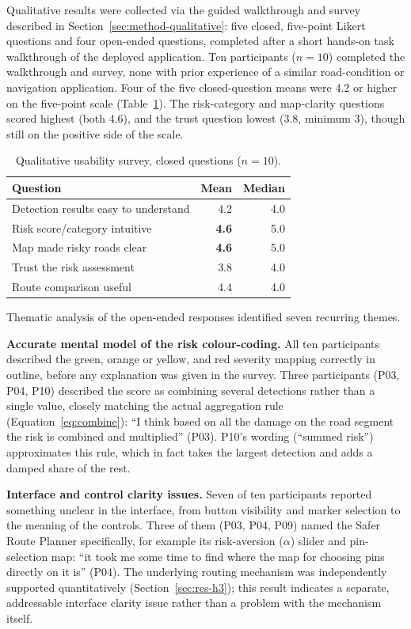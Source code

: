 \documentclass[10pt,a4paper,twocolumn]{article}
\begin{document}
Qualitative results were collected via the guided walkthrough and survey
described in Section~\ref{sec:method-qualitative}: five closed,
five-point Likert questions and four open-ended questions, completed
after a short hands-on task walkthrough of the deployed application.
Ten participants ($n=10$) completed the walkthrough and survey, none with
prior experience of a similar road-condition or navigation application.
Four of the five closed-question means were 4.2 or higher on the five-point
scale (Table~\ref{tab:qual-results}). The risk-category and map-clarity
questions scored highest (both 4.6), and the trust question lowest (3.8,
minimum 3), though still on the positive side of the scale.

\begin{table}[h]
  \centering
  \small
  \caption{Qualitative usability survey, closed questions ($n=10$).}
  \label{tab:qual-results}
  \begin{tabular}{@{}p{3.4cm}rr@{}}
    \toprule
    Question & Mean & Median \\
    \midrule
    Detection results easy to understand & 4.2 & 4.0 \\
    Risk score/category intuitive        & \textbf{4.6} & 5.0 \\
    Map made risky roads clear           & \textbf{4.6} & 5.0 \\
    Trust the risk assessment            & 3.8 & 4.0 \\
    Route comparison useful              & 4.4 & 4.0 \\
    \bottomrule
  \end{tabular}
\end{table}

Thematic analysis of the open-ended responses identified seven recurring
themes.

\textbf{Accurate mental model of the risk colour-coding.} All ten
participants described the green, orange or yellow, and red severity
mapping correctly in outline, before any explanation was given in the
survey. Three participants (P03, P04, P10) described the score as
combining several detections rather than a single value, closely matching
the actual aggregation rule (Equation~\ref{eq:combine}): ``I think based on
all the damage on the road segment the risk is combined and multiplied''
(P03). P10's wording (``summed risk'') approximates this rule, which in
fact takes the largest detection and adds a damped share of the rest.

\textbf{Interface and control clarity issues.} Seven of ten participants
reported something unclear in the interface, from button visibility and
marker selection to the meaning of the controls. Three of them (P03, P04,
P09) named the Safer Route Planner specifically, for example its
risk-aversion ($\alpha$) slider and pin-selection map: ``it took me some
time to find where the map for choosing pins directly on it is''
(P04). The underlying routing mechanism was independently supported
quantitatively (Section~\ref{sec:res-h3}); this result indicates a
separate, addressable interface clarity issue rather than a problem with
the mechanism itself.
\end{document}
